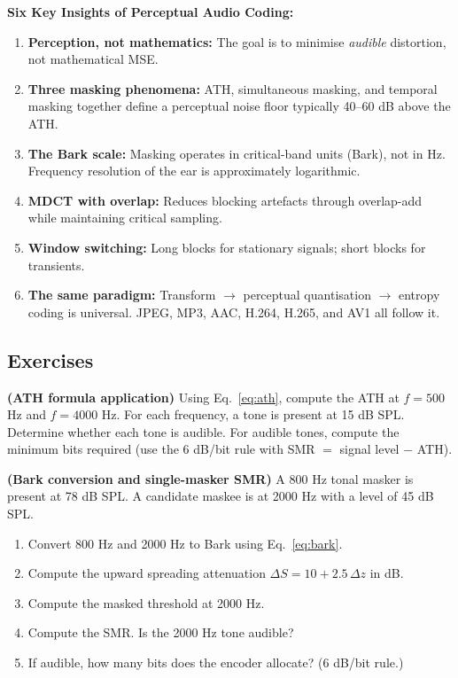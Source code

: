 \begin{importantbox}
\textbf{Six Key Insights of Perceptual Audio Coding:}
\begin{enumerate}[nosep]
  \item \textbf{Perception, not mathematics:} The goal is to minimise \emph{audible} distortion, not mathematical MSE.
  \item \textbf{Three masking phenomena:} ATH, simultaneous masking, and temporal masking together define a perceptual noise floor typically 40--60 dB above the ATH.
  \item \textbf{The Bark scale:} Masking operates in critical-band units (Bark), not in Hz. Frequency resolution of the ear is approximately logarithmic.
  \item \textbf{MDCT with overlap:} Reduces blocking artefacts through overlap-add while maintaining critical sampling.
  \item \textbf{Window switching:} Long blocks for stationary signals; short blocks for transients.
  \item \textbf{The same paradigm:} Transform $\to$ perceptual quantisation $\to$ entropy coding is universal. JPEG, MP3, AAC, H.264, H.265, and AV1 all follow it.
\end{enumerate}
\end{importantbox}

\subsection{Exercises}

\begin{exercisebox}
\textbf{(ATH formula application)}
Using Eq.~\eqref{eq:ath}, compute the ATH at $f = 500$ Hz and $f = 4000$ Hz. For each frequency, a tone is present at 15 dB SPL. Determine whether each tone is audible. For audible tones, compute the minimum bits required (use the 6 dB/bit rule with SMR $=$ signal level $-$ ATH).
\end{exercisebox}

\begin{exercisebox}
\textbf{(Bark conversion and single-masker SMR)}
A 800 Hz tonal masker is present at 78 dB SPL. A candidate maskee is at 2000 Hz with a level of 45 dB SPL.
\begin{enumerate}[nosep, label=(\alph*)]
  \item Convert 800 Hz and 2000 Hz to Bark using Eq.~\eqref{eq:bark}.
  \item Compute the upward spreading attenuation $\Delta S = 10 + 2.5\,\Delta z$ in dB.
  \item Compute the masked threshold at 2000 Hz.
  \item Compute the SMR. Is the 2000 Hz tone audible?
  \item If audible, how many bits does the encoder allocate? (6 dB/bit rule.)
\end{enumerate}
\end{exercisebox}

